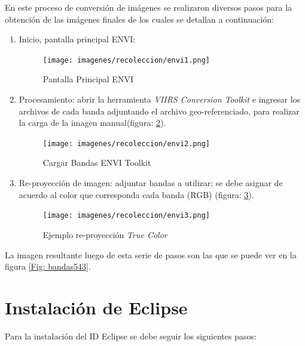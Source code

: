En este proceso de conversión de imágenes se realizaron diversos pasos para la obtención de las imágenes finales de los cuales se detallan a continuación:

\begin{enumerate}

\item Inicio, pantalla principal ENVI:
	\begin{figure}[H]\centering
		\texttt{[image: imagenes/recoleccion/envi1.png]}
  		\caption{Pantalla Principal ENVI} \label{Fig: envi1}
	\end{figure}


\item Procesamiento: abrir la herramienta \textit{VIIRS Conversion Toolkit} e ingresar los archivos de cada banda adjuntando el archivo  geo-referenciado, para realizar la carga de la imagen manual(figura: \ref{Fig: envi2}).

\begin{figure}[H] \centering
  \texttt{[image: imagenes/recoleccion/envi2.png]}
  \caption{Cargar Bandas ENVI Toolkit} \label{Fig: envi2}
\end{figure}

\item Re-proyección de imagen: adjuntar bandas a utilizar; se debe asignar de acuerdo al color que corresponda cada banda (RGB) (figura: \ref{Fig: envi3}).
 
\begin{figure}[H]
 \centering
  \texttt{[image: imagenes/recoleccion/envi3.png]}
  \caption{Ejemplo re-proyección \textit{True Color}}
	\label{Fig: envi3}
\end{figure}

\end{enumerate}

La imagen resultante luego de esta serie de pasos  son las que se puede ver en la figura \ref{Fig: bandas543}.

\section{Instalación de Eclipse}\label{sec:instalacionEclipse}
Para la instalación del ID Eclipse se debe seguir los siguientes pasos:

